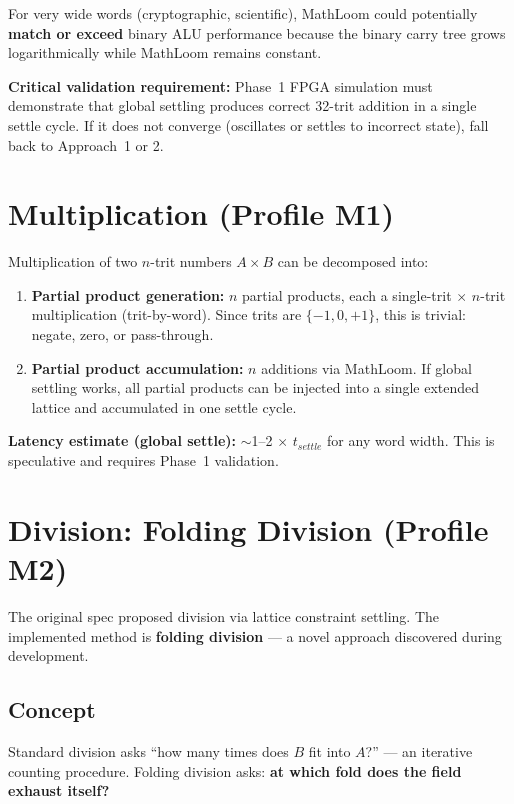 \documentclass[11pt, a4paper]{report}
\begin{document}
For very wide words (cryptographic, scientific), MathLoom could
potentially \textbf{match or exceed} binary ALU performance because the
binary carry tree grows logarithmically while MathLoom remains constant.

\textbf{Critical validation requirement:} Phase~1 FPGA simulation must
demonstrate that global settling produces correct 32-trit addition in a
single settle cycle. If it does not converge (oscillates or settles to
incorrect state), fall back to Approach~1 or 2.

\section{Multiplication (Profile M1)}

Multiplication of two $n$-trit numbers $A \times B$ can be decomposed
into:
\begin{enumerate}[nosep]
  \item \textbf{Partial product generation:} $n$ partial products, each
        a single-trit $\times$ $n$-trit multiplication (trit-by-word).
        Since trits are $\{-1, 0, +1\}$, this is trivial: negate, zero,
        or pass-through.
  \item \textbf{Partial product accumulation:} $n$ additions via MathLoom.
        If global settling works, all partial products can be injected
        into a single extended lattice and accumulated in one settle cycle.
\end{enumerate}

\textbf{Latency estimate (global settle):} $\sim$1--2 $\times$ $t_{settle}$
for any word width. This is speculative and requires Phase~1 validation.

\section{Division: Folding Division (Profile M2)}

The original spec proposed division via lattice constraint settling.
The implemented method is \textbf{folding division} --- a novel approach
discovered during development.

\subsection{Concept}

Standard division asks ``how many times does $B$ fit into $A$?'' ---
an iterative counting procedure. Folding division asks: \textbf{at which
fold does the field exhaust itself?}
\end{document}
